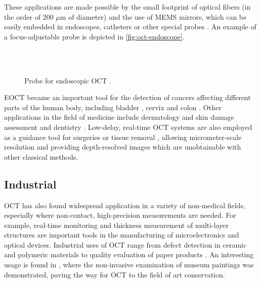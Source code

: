 These applications are made possible by the small footprint of optical fibers (in the order of 200 $\mu$m of diameter) and the use of \ac{MEMS} mirrors, which can be easily embedded in endoscopes, catheters or other special probes \citep{Tearney96,Liao2017}. An example of a focus-adjustable probe is depicted in \autoref{fig:oct-endoscope}.

\begin{figure}[hbt]
	\myfloatalign
	 \\
	\\
	\caption{Probe for endoscopic OCT \cite{Liao2017}.}\label{fig:oct-endoscope}
\end{figure}

\ac{EOCT} became an important tool for the detection of cancers affecting different parts of the human body, including bladder \citep{Xie2003}, cervix \citep{Escobar2004} and colon \citep{Hariri2006}. 
Other applications in the field of medicine include dermatology and skin damage assessment \citep{Korde2007,GAMBICHLER2005} and dentistry \citep{Amaechi2001,Machoy2017}. Low-delay, real-time OCT systems are also employed as a guidance tool for surgeries or tissue removal \cite{Boppart1999,Boppart2004}, allowing micrometer-scale resolution and providing depth-resolved images which are unobtainable with other classical methods.

\subsection{Industrial}
OCT has also found widespread application in a variety of non-medical fields, especially where non-contact, high-precision measurements are needed. For example, real-time monitoring and thickness measurement of multi-layer structures are important tools in the manufacturing of microelectronics and optical devices. Industrial uses of OCT range from defect detection in ceramic and polymeric materials \cite{Wiesauer2005,Su2014} to quality evaluation of paper products \cite{Prykari2010,Alarousu2005}. An interesting usage is found in \cite{Liang2005}, where the non-invasive examination of museum paintings was demonstrated, paving the way for OCT to the field of art conservation.

